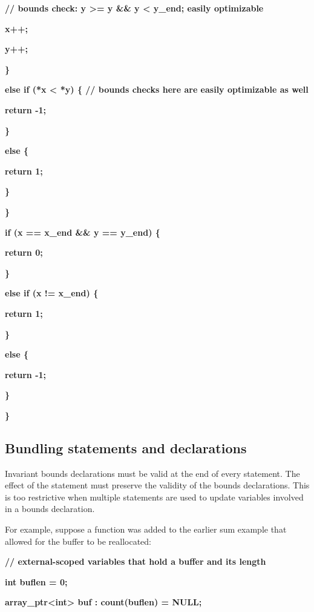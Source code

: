 \documentclass[]{article}
\begin{document}
\textbf{// bounds check: y \textgreater{}= y \&\& y \textless{} y\_end;
easily optimizable}

\textbf{x++;}

\textbf{y++;}

\textbf{\}}

\textbf{else if (*x \textless{} *y) \{ // bounds checks here are easily
optimizable as well}

\textbf{return -1;}

\textbf{\}}

\textbf{else \{}

\textbf{return 1;}

\textbf{\}}

\textbf{\}}

\textbf{if (x == x\_end \&\& y == y\_end) \{}

\textbf{return 0;}

\textbf{\}}

\textbf{else if (x != x\_end) \{}

\textbf{return 1;}

\textbf{\}}

\textbf{else \{}

\textbf{return -1; }

\textbf{\}}

\textbf{\}}

\subsection{\texorpdfstring{
\protect\hypertarget{ux5fToc435434944}{}{\protect\hypertarget{ux5fToc437460770}{}{\protect\hypertarget{ux5fToc440445448}{}{\protect\hypertarget{ux5fToc440449230}{}{\protect\hypertarget{ux5fToc440551880}{}{}}}}}Bundling
statements and
declarations}{ Bundling statements and declarations}}\label{bundling-statements-and-declarations}

Invariant bounds declarations must be valid at the end of every
statement. The effect of the statement must preserve the validity of the
bounds declarations. This is too restrictive when multiple statements
are used to update variables involved in a bounds declaration.

For example, suppose a function was added to the earlier sum example
that allowed for the buffer to be reallocated:

\textbf{// external-scoped variables that hold a buffer and its length}

\textbf{int buflen = 0;}

\textbf{array\_ptr\textless{}int\textgreater{} buf : count(buflen) =
NULL;}
\end{document}

